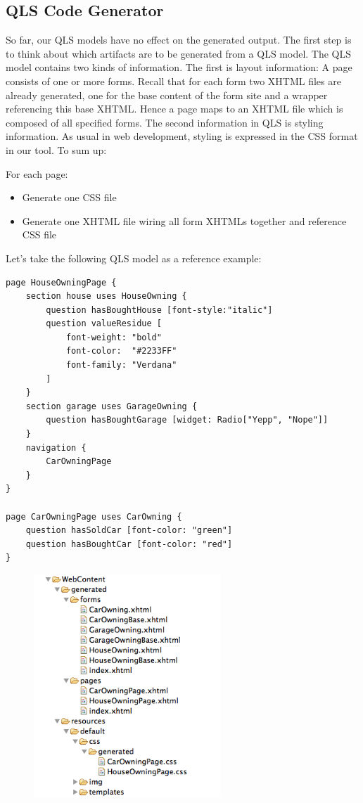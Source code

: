 \subsection{QLS Code Generator}

So far, our QLS models have no effect on the generated output. The first step
is to think about which artifacts are to be generated from a QLS model. The QLS
model contains two kinds of information. The first is layout information: A page
consists of one or more forms. Recall that for each form two XHTML files are
already generated, one for the base content of the form site and a wrapper
referencing this base XHTML. Hence a page maps to an XHTML file which is
composed of all specified forms. The second information in QLS is styling
information. As usual in web development, styling is expressed in the CSS format
in our tool. To sum up:

For each page:
\begin{itemize}
  \item Generate one CSS file
  \item Generate one XHTML file wiring all form XHTMLs together and reference
  CSS file
\end{itemize}

Let's take the following QLS model as a reference example:
\begin{lstlisting}[language=QLS]
page HouseOwningPage {
	section house uses HouseOwning {
		question hasBoughtHouse [font-style:"italic"]
		question valueResidue [
			font-weight: "bold" 
			font-color:  "#2233FF"
			font-family: "Verdana"
		]
	}
	section garage uses GarageOwning {
		question hasBoughtGarage [widget: Radio["Yepp", "Nope"]]		
	}
	navigation {
		CarOwningPage
	}
}

page CarOwningPage uses CarOwning {
	question hasSoldCar [font-color: "green"]
	question hasBoughtCar [font-color: "red"]
}
\end{lstlisting}


\begin{figure}
\includegraphics[width=7cm]{./images/chapter03/referenceimpl_projecttree_qls.png}
\end{figure}

